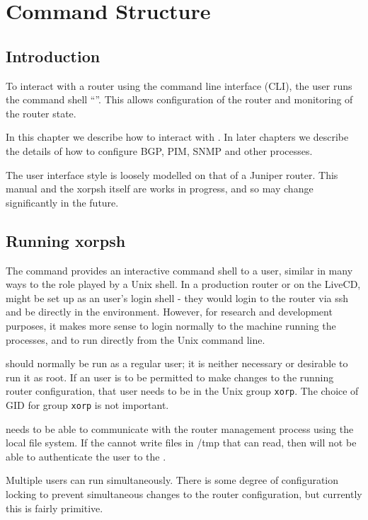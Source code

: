 %
%

\chapter{Command Structure}
\label{xorpsh}

\section{Introduction}
To interact with a \xorp router using the command line interface (CLI),
the user runs the \xorp command shell ``\xorpsh''.  This allows
configuration of the router and monitoring of the router state.

In this chapter we describe how to interact with \xorpsh.  In later
chapters we describe the details of how to configure BGP, PIM, SNMP and
other processes.

The user interface style is loosely modelled on that of a Juniper
router.  This manual and the xorpsh itself are works in progress, and
so may change significantly in the future.

\section{Running xorpsh}
The \xorpsh command provides an interactive command shell to a \xorp user,
similar in many ways to the role played by a Unix shell.  In a production
router or on the \xorp LiveCD, \xorpsh might be set up as an user's
login shell - they would login to the router via ssh and be directly
in the \xorpsh environment.  However, for research and development
purposes, it makes more sense to login normally to the machine running
the \xorp processes, and to run \xorpsh directly from the Unix command
line.

\xorpsh should normally be run as a regular user; it is neither
necessary or desirable to run it as root.  If an user is to be
permitted to make changes to the running router configuration, that user
needs to be in the Unix group {\tt xorp}.  The choice of GID for group
{\tt xorp} is not important.

\xorpsh needs to be able to communicate with the \xorp router
management process \rtrmgr using the local file system.  If
the \rtrmgr cannot write files in /tmp that \xorpsh can read, then
\xorpsh will not be able to authenticate the user to the \rtrmgr.

Multiple users can run \xorpsh simultaneously.  There is some degree of
configuration locking to prevent simultaneous changes to the router
configuration, but currently this is fairly primitive.

